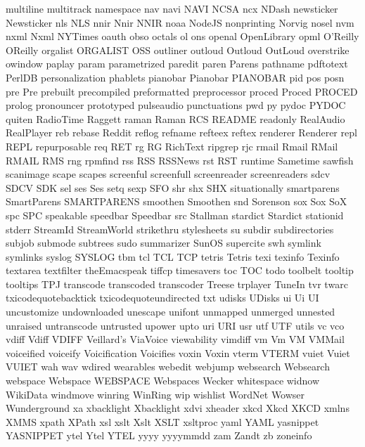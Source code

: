 multiline
multitrack
namespace
nav
navi
NAVI
NCSA
ncx
NDash
newsticker
Newsticker
nls
NLS
nnir
Nnir
NNIR
noaa
NodeJS
nonprinting
Norvig
nosel
nvm
nxml
Nxml
NYTimes
oauth
obso
octals
ol
ons
openal
OpenLibrary
opml
O'Reilly
OReilly
orgalist
ORGALIST
OSS
outliner
outloud
Outloud
OutLoud
overstrike
owindow
paplay
param
parametrized
paredit
paren
Parens
pathname
pdftotext
PerlDB
personalization
phablets
pianobar
Pianobar
PIANOBAR
pid
pos
posn
pre
Pre
prebuilt
precompiled
preformatted
preprocessor
proced
Proced
PROCED
prolog
pronouncer
prototyped
pulseaudio
punctuations
pwd
py
pydoc
PYDOC
quiten
RadioTime
Raggett
raman
Raman
RCS
README
readonly
RealAudio
RealPlayer
reb
rebase
Reddit
reflog
refname
refteex
reftex
renderer
Renderer
repl
REPL
repurposable
req
RET
rg
RG
RichText
ripgrep
rjc
rmail
Rmail
RMail
RMAIL
RMS
rng
rpmfind
rss
RSS
RSSNews
rst
RST
runtime
Sametime
sawfish
scanimage
scape
scapes
screenful
screenfull
screenreader
screenreaders
sdcv
SDCV
SDK
sel
ses
Ses
setq
sexp
SFO
shr
shx
SHX
situationally
smartparens
SmartParens
SMARTPARENS
smoothen
Smoothen
snd
Sorenson
sox
Sox
SoX
spc
SPC
speakable
speedbar
Speedbar
src
Stallman
stardict
Stardict
stationid
stderr
StreamId
StreamWorld
strikethru
stylesheets
su
subdir
subdirectories
subjob
submode
subtrees
sudo
summarizer
SunOS
supercite
swh
symlink
symlinks
syslog
SYSLOG
tbm
tcl
TCL
TCP
tetris
Tetris
texi
texinfo
Texinfo
textarea
textfilter
theEmacspeak
tiffcp
timesavers
toc
TOC
todo
toolbelt
tooltip
tooltips
TPJ
transcode
transcoded
transcoder
Treese
trplayer
TuneIn
tvr
twarc
txicodequotebacktick
txicodequoteundirected
txt
udisks
UDisks
ui
Ui
UI
uncustomize
undownloaded
unescape
unifont
unmapped
unmerged
unnested
unraised
untranscode
untrusted
upower
upto
uri
URI
usr
utf
UTF
utils
vc
vco
vdiff
Vdiff
VDIFF
Veillard's
ViaVoice
viewability
vimdiff
vm
Vm
VM
VMMail
voiceified
voiceify
Voicification
Voicifies
voxin
Voxin
vterm
VTERM
vuiet
Vuiet
VUIET
wah
wav
wdired
wearables
webedit
webjump
websearch
Websearch
webspace
Webspace
WEBSPACE
Webspaces
Wecker
whitespace
widnow
WikiData
windmove
winring
WinRing
wip
wishlist
WordNet
Wowser
Wunderground
xa
xbacklight
Xbacklight
xdvi
xheader
xkcd
Xkcd
XKCD
xmlns
XMMS
xpath
XPath
xsl
xslt
Xslt
XSLT
xsltproc
yaml
YAML
yasnippet
YASNIPPET
ytel
Ytel
YTEL
yyyy
yyyymmdd
zam
Zandt
zb
zoneinfo
